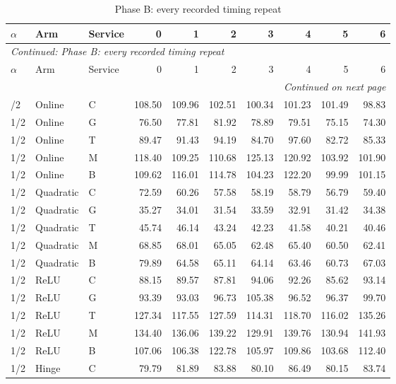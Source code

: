 \begingroup\footnotesize\setlength{\tabcolsep}{3pt}
\begin{longtable}{lllrrrrrrr}
\caption{Phase B: every recorded timing repeat}\label{tab:allclocks119b}\\
\toprule
$\alpha$ & Arm & Service & 0 & 1 & 2 & 3 & 4 & 5 & 6\\\midrule
\endfirsthead
\multicolumn{10}{l}{\textit{Continued: Phase B: every recorded timing repeat}}\\
\toprule
$\alpha$ & Arm & Service & 0 & 1 & 2 & 3 & 4 & 5 & 6\\\midrule
\endhead
\midrule\multicolumn{10}{r}{\textit{Continued on next page}}\\
\endfoot
\bottomrule
\endlastfoot
1/2 & Online & C & 108.50 & 109.96 & 102.51 & 100.34 & 101.23 & 101.49 & 98.83 \\
1/2 & Online & G & 76.50 & 77.81 & 81.92 & 78.89 & 79.51 & 75.15 & 74.30 \\
1/2 & Online & T & 89.47 & 91.43 & 94.19 & 84.70 & 97.60 & 82.72 & 85.33 \\
1/2 & Online & M & 118.40 & 109.25 & 110.68 & 125.13 & 120.92 & 103.92 & 101.90 \\
1/2 & Online & B & 109.62 & 116.01 & 114.78 & 104.23 & 122.20 & 99.99 & 101.15 \\
1/2 & Quadratic & C & 72.59 & 60.26 & 57.58 & 58.19 & 58.79 & 56.79 & 59.40 \\
1/2 & Quadratic & G & 35.27 & 34.01 & 31.54 & 33.59 & 32.91 & 31.42 & 34.38 \\
1/2 & Quadratic & T & 45.74 & 46.14 & 43.24 & 42.23 & 41.58 & 40.21 & 40.46 \\
1/2 & Quadratic & M & 68.85 & 68.01 & 65.05 & 62.48 & 65.40 & 60.50 & 62.41 \\
1/2 & Quadratic & B & 79.89 & 64.58 & 65.11 & 64.14 & 63.46 & 60.73 & 67.03 \\
1/2 & ReLU & C & 88.15 & 89.57 & 87.81 & 94.06 & 92.26 & 85.62 & 93.14 \\
1/2 & ReLU & G & 93.39 & 93.03 & 96.73 & 105.38 & 96.52 & 96.37 & 99.70 \\
1/2 & ReLU & T & 127.34 & 117.55 & 127.59 & 114.31 & 118.70 & 116.02 & 135.26 \\
1/2 & ReLU & M & 134.40 & 136.06 & 139.22 & 129.91 & 139.76 & 130.94 & 141.93 \\
1/2 & ReLU & B & 107.06 & 106.38 & 122.78 & 105.97 & 109.86 & 103.68 & 112.40 \\
1/2 & Hinge & C & 79.79 & 81.89 & 83.88 & 80.10 & 86.49 & 80.15 & 83.74 \\

\end{longtable}
